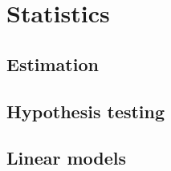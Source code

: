 \documentclass[main.tex]{subfiles}
\begin{document}
	\chapter{Statistics}
	\section{Estimation}
	
	\section{Hypothesis testing}
	
	\section{Linear models}
\end{document}
